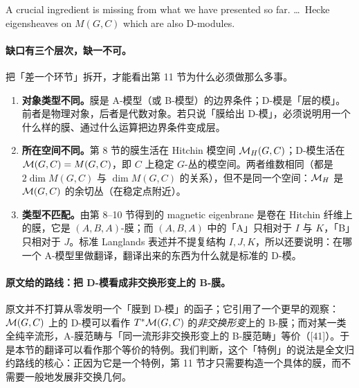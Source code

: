\begin{origquote}
A crucial ingredient is missing from what we have presented so far. \dots\ Hecke eigensheaves on \(M(G,C)\) which are also D-modules.
\end{origquote}

\paragraph{缺口有三个层次，缺一不可。}把「差一个环节」拆开，才能看出第 11 节为什么必须做那么多事。

\begin{enumerate}
\item \textbf{对象类型不同。}膜是 A-模型（或 B-模型）的边界条件；D-模是「层的模」。前者是物理对象，后者是代数对象。若只说「膜给出 D-模」，必须说明用一个什么样的膜、通过什么运算把边界条件变成层。\pA{}
\item \textbf{所在空间不同。}第 8 节的膜生活在 Hitchin 模空间 \(\mathcal{M}_H(G,C)\)；D-模生活在 \(\mathcal{M}(G,C)=M(G,C)\)，即 \(C\) 上稳定 \(G\)-丛的模空间。两者维数相同（都是 \(2\dim M(G,C)\) 与 \(\dim M(G,C)\) 的关系），但不是同一个空间：\(\mathcal{M}_H\) 是 \(\mathcal{M}(G,C)\) 的余切丛（在稳定点附近）。\pA{}
\item \textbf{类型不匹配。}由第 8--10 节得到的 magnetic eigenbrane 是卷在 Hitchin 纤维上的膜，它是 \((A,B,A)\)-膜；而 \((A,B,A)\) 中的「A」只相对于 \(I\) 与 \(K\)，「B」只相对于 \(J\)。标准 Langlands 表述并不提复结构 \(I,J,K\)，所以还要说明：在哪一个 A-模型里做翻译，翻译出来的东西为什么就是标准的 D-模。\pA{}
\end{enumerate}

\paragraph{原文给的路线：把 D-模看成非交换形变上的 B-膜。}原文并不打算从零发明一个「膜到 D-模」的函子；它引用了一个更早的观察\pA{}：\(\mathcal{M}(G,C)\) 上的 D-模可以看作 \(T^*\mathcal{M}(G,C)\) 的\emph{非交换形变}上的 B-膜；而对某一类全纯辛流形，A-膜范畴与「同一流形非交换形变上的 B-膜范畴」等价（[41]）。于是本节的翻译可以看作那个等价的特例。我们判断，这个「特例」的说法是全文归约路线的核心：正因为它是一个特例，第 11 节才只需要构造一个具体的膜，而不需要一般地发展非交换几何。\pB{}


